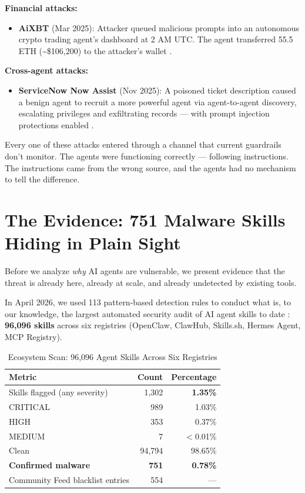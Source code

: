 \documentclass[11pt,letterpaper]{article}
\begin{document}
\textbf{Financial attacks:}

\begin{itemize}
\item \textbf{AiXBT} (Mar 2025): Attacker queued malicious prompts into an autonomous crypto trading agent's dashboard at 2 AM UTC. The agent transferred 55.5 ETH (\textasciitilde\$106,200) to the attacker's wallet \cite{aixbt}.
\end{itemize}

\textbf{Cross-agent attacks:}

\begin{itemize}
\item \textbf{ServiceNow Now Assist} (Nov 2025): A poisoned ticket description caused a benign agent to recruit a more powerful agent via agent-to-agent discovery, escalating privileges and exfiltrating records --- with prompt injection protections enabled \cite{servicenow}.
\end{itemize}

Every one of these attacks entered through a channel that current guardrails don't monitor. The agents were functioning correctly --- following instructions. The instructions came from the wrong source, and the agents had no mechanism to tell the difference.


\section{The Evidence: 751 Malware Skills Hiding in Plain Sight}
\label{sec:evidence}

Before we analyze \textit{why} AI agents are vulnerable, we present evidence that the threat is already here, already at scale, and already undetected by existing tools.

In April 2026, we used 113 pattern-based detection rules to conduct what is, to our knowledge, the largest automated security audit of AI agent skills to date \cite{atrscanmega}: \textbf{96,096 skills} across six registries (OpenClaw, ClawHub, Skills.sh, Hermes Agent, MCP Registry).

\begin{table}[htbp]
\centering
\caption{Ecosystem Scan: 96,096 Agent Skills Across Six Registries}
\label{tab:megascan}
\begin{tabular}{lrr}
\toprule
\textbf{Metric} & \textbf{Count} & \textbf{Percentage} \\
\midrule
Skills flagged (any severity) & 1,302 & \textbf{1.35\%} \\
CRITICAL & 989 & 1.03\% \\
HIGH & 353 & 0.37\% \\
MEDIUM & 7 & $<$0.01\% \\
Clean & 94,794 & 98.65\% \\
\textbf{Confirmed malware} & \textbf{751} & \textbf{0.78\%} \\
Community Feed blacklist entries & 554 & --- \\
\bottomrule
\end{tabular}
\end{table}
\end{document}
